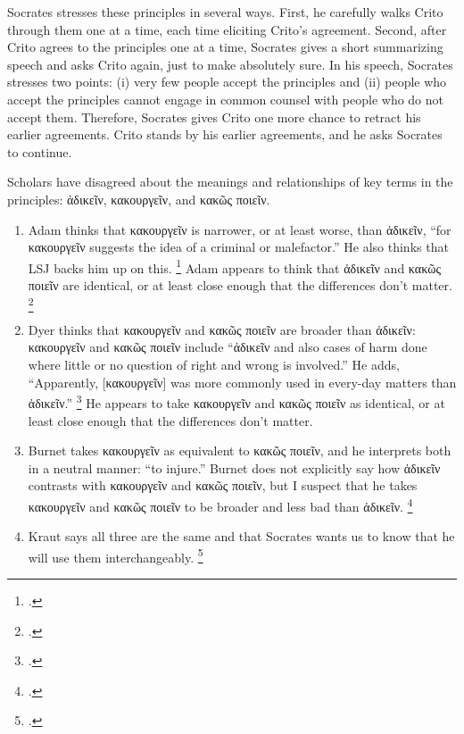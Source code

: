 \documentclass[12pt,letterpaper]{article}
\begin{document}
Socrates stresses these principles in several ways.
First, he carefully walks Crito through them one at a time, each time eliciting Crito's agreement.
Second, after Crito agrees to the principles one at a time, Socrates gives a short summarizing speech and asks Crito again, just to make absolutely sure.
In his speech, Socrates stresses two points: (i) very few people accept the principles and (ii) people who accept the principles cannot engage in common counsel with people who do not accept them.
Therefore, Socrates gives Crito one more chance to retract his earlier agreements.
Crito stands by his earlier agreements, and he asks Socrates to continue.

Scholars have disagreed about the meanings and relationships of key terms in the principles: \textgreek{ἀδικεῖν}, \textgreek{κακουργεῖν}, and \textgreek{κακῶς ποιεῖν}.

\begin{enumerate}
    \item Adam thinks that \textgreek{κακουργεῖν} is narrower, or at least worse, than \textgreek{ἀδικεῖν}, ``for \textgreek{κακουργεῖν} suggests the idea of a criminal or malefactor.''
        He also thinks that LSJ backs him up on this.%
        \footcite[][on 49c3]{adam1988-crito}
        Adam appears to think that \textgreek{ἀδικεῖν} and \textgreek{κακῶς ποιεῖν} are identical, or at least close enough that the differences don't matter.%
        \footcite[This is how I understand his reference to \textit{Republic} 335b, where ``\textgreek{ἀδικεῖν} is identified with \textgreek{κακοὺς ποιεῖν} rather than \textgreek{κακῶς ποιεῖν} through the middle term \textgreek{βλάπτειν}.''][on 49c7]{adam1988-crito}
    \item Dyer thinks that \textgreek{κακουργεῖν} and \textgreek{κακῶς ποιεῖν} are broader than \textgreek{ἀδικεῖν}: \textgreek{κακουργεῖν} and \textgreek{κακῶς ποιεῖν} include ``\textgreek{ἀδικεῖν} and also cases of harm done where little or no question of right and wrong is involved.''
        He adds, ``Apparently, [\textgreek{κακουργεῖν}] was more commonly used in every-day matters than \textgreek{ἀδικεῖν}.''%
        \footcite[][on 49c2]{dyer-apology-crito-2007} He appears to take \textgreek{κακουργεῖν} and \textgreek{κακῶς ποιεῖν} as identical, or at least close enough that the differences don't matter.
    \item Burnet takes \textgreek{κακουργεῖν} as equivalent to \textgreek{κακῶς ποιεῖν}, and he interprets both in a neutral manner: ``to injure.'' Burnet does not explicitly say how \textgreek{ἀδικεῖν} contrasts with \textgreek{κακουργεῖν} and \textgreek{κακῶς ποιεῖν}, but I suspect that he takes \textgreek{κακουργεῖν} and \textgreek{κακῶς ποιεῖν} to be broader and less bad than \textgreek{ἀδικεῖν}.%
        \footcite[][on49c2]{burnet1924-euthyphro-apology-crito}
    \item Kraut says all three are the same and that Socrates wants us to know that he will use them interchangeably.%
        \footcite[][27--28]{kraut-socrates-state-1984}
\end{enumerate}
\end{document}
